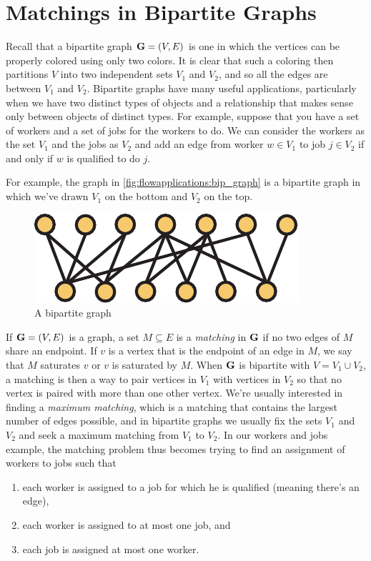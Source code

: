 \section{Matchings in Bipartite Graphs}\label{s:flowapplications:bip-match}

Recall that a bipartite graph $\mathbf{G}=(V,E)$ is one in which the vertices can
be properly colored using only two colors. It is clear that such a
coloring then partitions $V$ into two independent sets $V_1$ and
$V_2$, and so all the edges are between $V_1$ and $V_2$. Bipartite
graphs have many useful applications, particularly when we have two
distinct types of objects and a relationship that makes sense only
between objects of distinct types. For example, suppose that you have
a set of workers and a set of jobs for the workers to do. We can
consider the workers as the set $V_1$ and the jobs as $V_2$ and add an
edge from worker $w\in V_1$ to job $j\in V_2$ if and only if $w$ is
qualified to do $j$. 

For example, the graph in \autoref{fig:flowapplications:bip_graph} is
a bipartite graph in which we've drawn $V_1$ on the bottom and $V_2$
on the top.

\begin{figure}[h]
  \centering
  \includegraphics[scale=0.65]{flowapplications-figs/bipartite_graph}
  \caption{A bipartite graph}
  \label{fig:flowapplications:bip_graph}
\end{figure}

If $\mathbf{G}=(V,E)$ is a graph, a set $M\subseteq E$ is a \emph{matching} in
$\mathbf{G}$ if no two edges of $M$ share an endpoint. If $v$ is a vertex
that is the endpoint of an edge in $M$, we say that $M$ saturates $v$
or $v$ is saturated by $M$. When $\mathbf{G}$ is bipartite with $V=V_1\cup
V_2$, a matching is then a way to pair vertices in $V_1$ with vertices
in $V_2$ so that no vertex is paired with more than one other
vertex. We're usually interested in finding a \emph{maximum matching},
which is a matching that contains the largest number of edges
possible, and in bipartite graphs we usually fix the sets $V_1$ and
$V_2$ and seek a maximum matching from $V_1$ to $V_2$. In our workers
and jobs example, the matching problem thus becomes trying to find an
assignment of workers to jobs such that
\begin{enumerate}[label=(\roman*)]
\item each worker is assigned to a job for which he is qualified
  (meaning there's an edge),
\item each worker is assigned to at most one job, and
\item each job is assigned at most one worker.
\end{enumerate}

